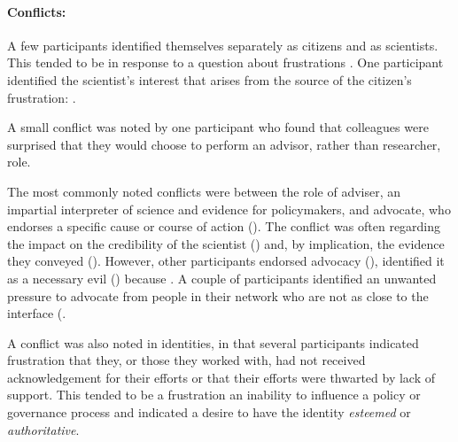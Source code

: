 \paragraph{Conflicts:}
A few participants identified themselves separately as citizens and as scientists. This tended to be in response to a question about frustrations . One participant identified the scientist's interest that arises from the source of the citizen's frustration: .

A small conflict was noted by one participant who found that colleagues were surprised that they would choose to perform an advisor, rather than researcher, role.

The most commonly noted conflicts were between the role of adviser, an impartial interpreter of science and evidence for policymakers, and advocate, who endorses a specific cause or course of action (). The conflict was often regarding the impact on the credibility of the scientist () and, by implication, the evidence they conveyed (). However, other participants endorsed advocacy (), identified it as a necessary evil () because . A couple of participants identified an unwanted pressure to advocate from people in their network who are not as close to the interface (.

A conflict was also noted in identities, in that several participants indicated frustration that they, or those they worked with, had not received acknowledgement for their efforts or that their efforts were thwarted by lack of support. This tended to be a frustration an inability to influence a policy or governance process and indicated a desire to have the identity \emph{esteemed} or \emph{authoritative}.


